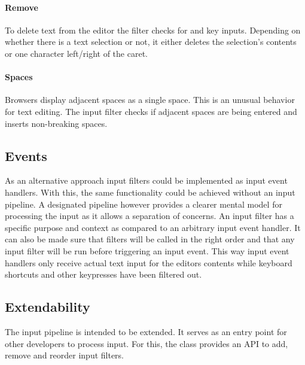 \paragraph{Remove} To delete text from the editor the  filter checks for  and  key inputs. Depending on whether there is a text selection or not, it either deletes the selection's contents or one character left/right of the caret.

\paragraph{Spaces} Browsers display adjacent spaces as a single space. This is an unusual behavior for text editing. The  input filter checks if adjacent spaces are being entered and inserts non-breaking spaces.

\subsection{Events} As an alternative approach input filters could be implemented as input event handlers. With this, the same functionality could be achieved without an input pipeline. A designated pipeline however provides a clearer mental model for processing the input as it allows a separation of concerns. An input filter has a specific purpose and context as compared to an arbitrary input event handler. It can also be made sure that filters will be called in the right order and that any input filter will be run before triggering an input event. This way input event handlers only receive actual text input for the editors contents while keyboard shortcuts and other keypresses have been filtered out.

\subsection{Extendability} The input pipeline is intended to be extended. It serves as an entry point for other developers to process input. For this, the  class provides an API to add, remove and reorder input filters.




